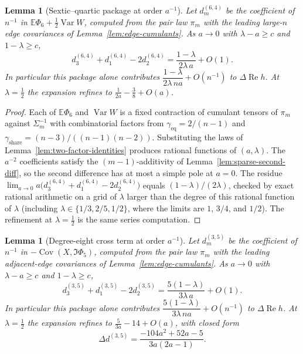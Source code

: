 \documentclass[11pt]{article}
\newtheorem{lemma}[theorem]{Lemma}
\newcommand{\EE}{\mathbb{E}}
\begin{document}
\begin{lemma}[Sextic--quartic package at order \(a^{-1}\)]
\label{lem:phi6-varw-delta}
Let \(d_m^{(6,4)}\) be the coefficient of \(n^{-1}\) in
\(\EE\Phi_6+\tfrac12\operatorname{Var}W\), computed from the pair law \(\pi_m\) with
the leading large-\(n\) edge covariances of Lemma~\ref{lem:edge-cumulants}.
As \(a\to0\) with \(\lambda-a\ge c\) and \(1-\lambda\ge c\),
\[
d_3^{(6,4)}+d_1^{(6,4)}-2d_2^{(6,4)}
=
\frac{1-\lambda}{2\lambda\,a}+O(1).
\]
In particular this package alone contributes
\(\dfrac{1-\lambda}{2\lambda\,na}+O(n^{-1})\) to \(\Delta\operatorname{Re}h\).
At \(\lambda=\tfrac12\) the expansion refines to \(\frac1{2a}-\frac38+O(a)\).
\end{lemma}

\begin{proof}
Each of \(\EE\Phi_6\) and \(\operatorname{Var}W\) is a fixed contraction of cumulant
tensors of \(\pi_m\) against \(\Sigma_m^{-1}\) with combinatorial factors from
\(\gamma_{\mathrm{eq}}=2/(n-1)\) and \(\gamma_{\mathrm{share}}=(n-3)/((n-1)(n-2))\).
Substituting the laws of Lemma~\ref{lem:two-factor-identities} produces
rational functions of \((a,\lambda)\). The \(a^{-2}\) coefficients satisfy the
\((m-1)\)-additivity of Lemma~\ref{lem:sparse-second-diff}, so the second
difference has at most a simple pole at \(a=0\). The residue
\(\lim_{a\to0}a\bigl(d_3^{(6,4)}+d_1^{(6,4)}-2d_2^{(6,4)}\bigr)\) equals
\((1-\lambda)/(2\lambda)\), checked by exact rational arithmetic on a grid of
\(\lambda\) larger than the degree of this rational function of \(\lambda\)
(including \(\lambda\in\{1/3,2/5,1/2\}\), where the limits are \(1\), \(3/4\),
and \(1/2\)). The refinement at \(\lambda=\tfrac12\) is the same series
computation.
\end{proof}

\begin{lemma}[Degree-eight cross term at order \(a^{-1}\)]
\label{lem:c35-delta}
Let \(d_m^{(3,5)}\) be the coefficient of \(n^{-1}\) in
\(-\operatorname{Cov}(X,\Im\Phi_5)\), computed from the pair law \(\pi_m\) with
the leading adjacent-edge covariances of Lemma~\ref{lem:edge-cumulants}.
As \(a\to0\) with \(\lambda-a\ge c\) and \(1-\lambda\ge c\),
\[
d_3^{(3,5)}+d_1^{(3,5)}-2d_2^{(3,5)}
=
\frac{5(1-\lambda)}{3\lambda\,a}+O(1).
\]
In particular this package alone contributes
\(\dfrac{5(1-\lambda)}{3\lambda\,na}+O(n^{-1})\) to \(\Delta\operatorname{Re}h\).
At \(\lambda=\tfrac12\) the expansion refines to \(\frac5{3a}-14+O(a)\), with
closed form
\[
\Delta d^{(3,5)}
=
\frac{-104a^2+52a-5}{3a(2a-1)}.
\]
\end{lemma}
\end{document}
